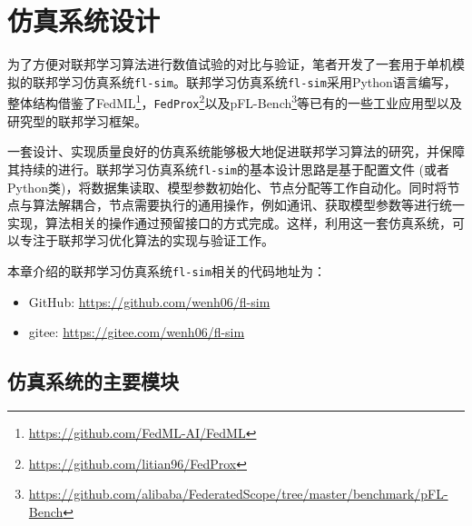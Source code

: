 \newcommand{\urlgithub}{\url{https://github.com/wenh06/fl-sim}}
\newcommand{\urlgitee}{\url{https://gitee.com/wenh06/fl-sim}}

\section{仿真系统设计}
\label{sec:chap5-design}


为了方便对联邦学习算法进行数值试验的对比与验证，笔者开发了一套用于单机模拟的联邦学习仿真系统\texttt{fl-sim}。联邦学习仿真系统\texttt{fl-sim}采用Python语言编写，整体结构借鉴了FedML\footnote{\url{https://github.com/FedML-AI/FedML}}\parencite{he_2020_fedml}，\texttt{FedProx}\footnote{\url{https://github.com/litian96/FedProx}}\parencite{sahu2018fedprox}以及pFL-Bench\footnote{\url{https://github.com/alibaba/FederatedScope/tree/master/benchmark/pFL-Bench}}\parencite{chen_2022_pfl_bench}等已有的一些工业应用型以及研究型的联邦学习框架。

一套设计、实现质量良好的仿真系统能够极大地促进联邦学习算法的研究，并保障其持续的进行。联邦学习仿真系统\texttt{fl-sim}的基本设计思路是基于配置文件 (或者Python类)，将数据集读取、模型参数初始化、节点分配等工作自动化。同时将节点与算法解耦合，节点需要执行的通用操作，例如通讯、获取模型参数等进行统一实现，算法相关的操作通过预留接口的方式完成。这样，利用这一套仿真系统，可以专注于联邦学习优化算法的实现与验证工作。

本章介绍的联邦学习仿真系统\texttt{fl-sim}相关的代码地址为：
\begin{itemize}
    \item GitHub: \urlgithub
    \item gitee: \urlgitee
\end{itemize}

\subsection{仿真系统的主要模块}

